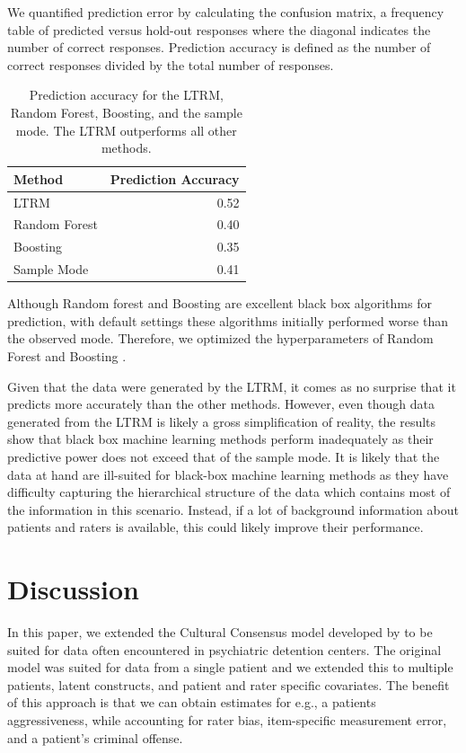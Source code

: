 \documentclass{article}
\begin{document}
We quantified prediction error by calculating the confusion matrix, a frequency table of predicted versus hold-out responses where the diagonal indicates the number of correct responses. Prediction accuracy is defined as the number of correct responses divided by the total number of responses.

\begin{table}[!ht]
	\centering
	\caption{Prediction accuracy for the LTRM, Random Forest, Boosting, and the sample mode. The LTRM outperforms all other methods.}
	\begin{tabular}{lr}
		\hline
		Method & Prediction Accuracy \\ 
		\hline
		LTRM 		  & 0.52 \\ 
		Random Forest & 0.40 \\ 
		Boosting 	  & 0.35 \\ 
		Sample Mode   & 0.41 \\ 
		\hline
	\end{tabular}
\end{table}

Although Random forest and Boosting are excellent black box algorithms for prediction, with default settings these algorithms initially performed worse than the observed mode. Therefore, we optimized the hyperparameters of Random Forest and Boosting \cite{kuhn2008building}.

Given that the data were generated by the LTRM, it comes as no surprise that it predicts more accurately than the other methods. However, even though data generated from the LTRM is likely a gross simplification of reality, the results show that black box machine learning methods perform inadequately as their predictive power does not exceed that of the sample mode. It is likely that the data at hand are ill-suited for black-box machine learning methods as they have difficulty capturing the hierarchical structure of the data which contains most of the information in this scenario. Instead, if a lot of background information about patients and raters is available, this could likely improve their performance.

 
\section*{Discussion}

In this paper, we extended the Cultural Consensus model developed by  to be suited for data often encountered in psychiatric detention centers. The original model was suited for data from a single patient and we extended this to multiple patients, latent constructs, and patient and rater specific covariates. The benefit of this approach is that we can obtain estimates for e.g., a patients aggressiveness, while accounting for rater bias, item-specific measurement error, and a patient's criminal offense.
\end{document}
